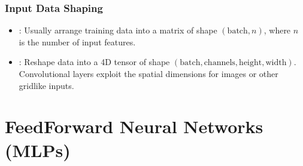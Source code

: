 \documentclass[letterpaper,10pt,english]{jupyterBook}
\begin{document}
\subsubsection{Input Data Shaping}
\label{\detokenize{04:input-data-shaping}}\begin{itemize}
\item {} 
\sphinxAtStartPar
{}: Usually arrange training data into a matrix of shape \((\text{batch}, n)\), where \(n\) is the number of input features.

\item {} 
\sphinxAtStartPar
{}: Reshape data into a 4D tensor of shape \((\text{batch}, \text{channels}, \text{height}, \text{width})\). Convolutional layers exploit the spatial dimensions for images or other grid\sphinxhyphen{}like inputs.

\end{itemize}


\section{Feed\sphinxhyphen{}Forward Neural Networks (MLPs)}
\label{\detokenize{04:feed-forward-neural-networks-mlps}}
\end{document}
